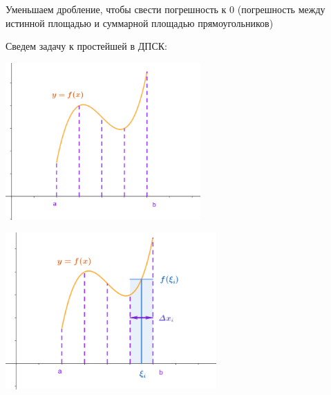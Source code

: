 \documentclass[12pt]{article}
\begin{document}
    Уменьшаем дробление, чтобы свести погрешность к 0 (погрешность между истинной площадью и суммарной площадью прямоугольников)

    Сведем задачу к простейшей в ДПСК:

    \vspace{10mm}


    \begin{multicols}{2}
        \includegraphics[height=6cm]{calculus/images/calculus_2024_02_07_2}

        \includegraphics[height=6cm]{calculus/images/calculus_2024_02_07_3}
    \end{multicols}
\end{document}
